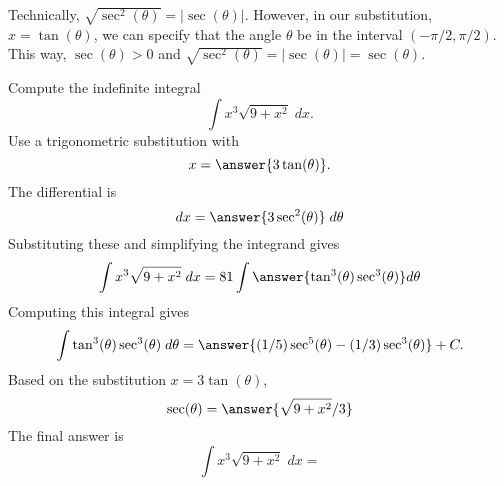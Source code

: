 \documentclass{ximera}
\begin{document}
\begin{remark}
Technically, $\sqrt{\sec^2(\theta)} = |\sec(\theta)|$. However, in our substitution, $x = \tan(\theta)$,
we can specify that the angle $\theta$ be in the interval $(-\pi/2, \pi/2)$. This way, 
$\sec(\theta) > 0$ and $\sqrt{\sec^2(\theta)} = |\sec(\theta)| = \sec(\theta)$.
\end{remark}




\begin{problem}
Compute the indefinite integral
\[
\int   x^3\sqrt{9 + x^2}\; dx.
\]
Use a trigonometric substitution with\\
\[
x = \answer{3\tan(\theta)}.
\]
The differential is\\
\[
dx = \answer{3\sec^2(\theta)} \; d\theta
\]
Substituting these and simplifying the integrand gives\\
\[
\int   x^3\sqrt{9 + x^2}\; dx = 81\int \answer{\tan^3(\theta)\sec^3(\theta)} d\theta
\]
Computing this integral gives
\[
\int \tan^3(\theta)\sec^3(\theta) \; d\theta = \answer{(1/5)\sec^5(\theta) - (1/3)\sec^3(\theta)} + C.
\]
Based on the substitution $x = 3\tan(\theta)$, \\
\[
\sec(\theta) = \answer{\sqrt{9+x^2}/3}
\]
The final answer is
\[
\int   x^3\sqrt{9 + x^2}\; dx = 
\]
\begin{center}
\begin{multipleChoice}
\end{multipleChoice}
\end{center}
\end{problem}
\end{document}
